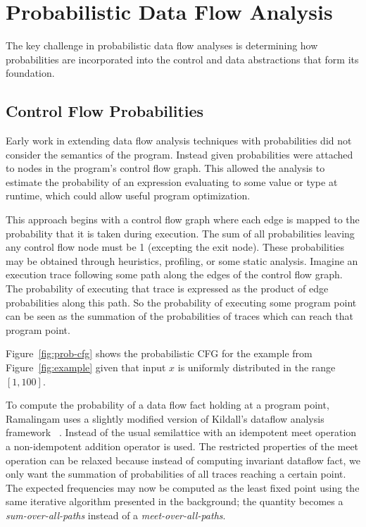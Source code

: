 \section{Probabilistic Data Flow Analysis}
\label{sec:pdfa}

The key challenge in probabilistic data flow analyses is
determining how probabilities are incorporated into the control
and data abstractions that form its foundation.

\subsection{Control Flow Probabilities}
Early work in extending data flow analysis 
techniques with probabilities did not consider
the semantics of the program. 
Instead given probabilities 
were attached to nodes in the program's control flow graph.  
This allowed the analysis to estimate
the probability of an expression evaluating 
to some value or type at runtime, which could 
allow useful program optimization.

This approach begins with a control flow graph where each edge is 
mapped to the probability that it is taken during execution.
The sum of all probabilities leaving any control flow node must be 1
(excepting the exit node).
These probabilities may be obtained through heuristics, profiling,
or some static analysis.
Imagine an execution trace following some path along the edges of
the control flow graph.
The probability of executing that trace is expressed as the product of 
edge probabilities along this path.
So the probability of executing some program point can be seen as the
summation of the probabilities of traces which can reach that program point.


Figure~\ref{fig:prob-cfg} shows the probabilistic CFG for the
example from Figure~\ref{fig:example} given that input $x$
is uniformly distributed in the range $[1,100]$.

To compute the probability of a data flow fact holding 
at a program point, Ramalingam uses a slightly
modified version of Kildall's dataflow analysis framework
~\cite{ramalingam1996data}.
Instead of the usual semilattice with an idempotent meet
operation a non-idempotent addition operator is used.
The restricted properties of the meet operation can be
relaxed because instead of computing invariant dataflow
fact, we only want the summation of probabilities of all
traces reaching a certain point.
The expected frequencies may now be computed as the least
fixed point using the same iterative algorithm presented
in the background; the quantity becomes a
{\sl sum-over-all-paths} instead of a {\sl meet-over-all-paths}.

